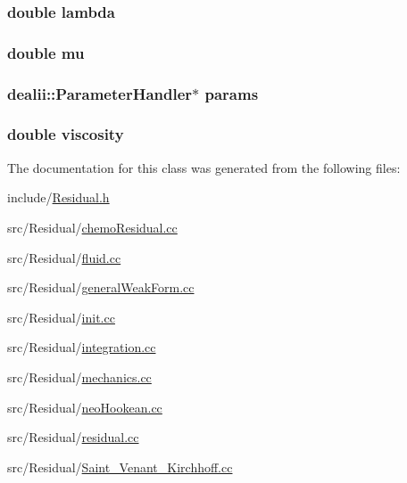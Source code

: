 \subsubsection[{lambda}]{\setlength{\rightskip}{0pt plus 5cm}double lambda}\label{class_residual_a3db359547eed8cfd48ca821d95f577af}
\subsubsection[{mu}]{\setlength{\rightskip}{0pt plus 5cm}double mu}\label{class_residual_a74577585cf12d1712ab9c57616d49205}
\subsubsection[{params}]{\setlength{\rightskip}{0pt plus 5cm}dealii\-::\-Parameter\-Handler$\ast$ params}\label{class_residual_accca5aede13ea52f0c11dff4daf1ad97}
\subsubsection[{viscosity}]{\setlength{\rightskip}{0pt plus 5cm}double viscosity}\label{class_residual_ad80875e5d1c4362e2eae93663ad723fb}


The documentation for this class was generated from the following files\-:\begin{DoxyCompactItemize}
\item 
include/\hyperlink{_residual_8h}{Residual.\-h}\item 
src/\-Residual/\hyperlink{chemo_residual_8cc}{chemo\-Residual.\-cc}\item 
src/\-Residual/\hyperlink{fluid_8cc}{fluid.\-cc}\item 
src/\-Residual/\hyperlink{general_weak_form_8cc}{general\-Weak\-Form.\-cc}\item 
src/\-Residual/\hyperlink{init_8cc}{init.\-cc}\item 
src/\-Residual/\hyperlink{integration_8cc}{integration.\-cc}\item 
src/\-Residual/\hyperlink{mechanics_8cc}{mechanics.\-cc}\item 
src/\-Residual/\hyperlink{neo_hookean_8cc}{neo\-Hookean.\-cc}\item 
src/\-Residual/\hyperlink{residual_8cc}{residual.\-cc}\item 
src/\-Residual/\hyperlink{_saint___venant___kirchhoff_8cc}{Saint\-\_\-\-Venant\-\_\-\-Kirchhoff.\-cc}\end{DoxyCompactItemize}
